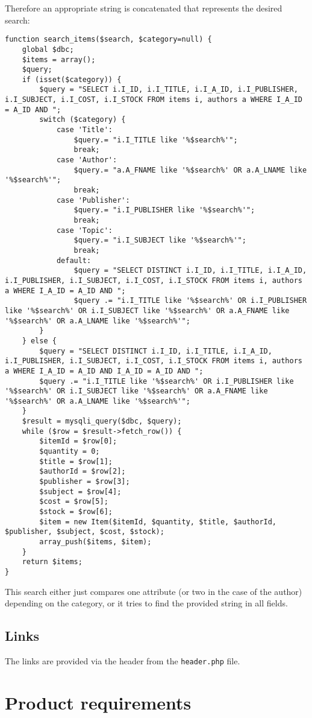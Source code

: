 Therefore an appropriate string is concatenated that represents the desired search:

\begin{lstlisting}[caption=The search function]
function search_items($search, $category=null) {
	global $dbc;
	$items = array();
	$query;
	if (isset($category)) {
		$query = "SELECT i.I_ID, i.I_TITLE, i.I_A_ID, i.I_PUBLISHER, i.I_SUBJECT, i.I_COST, i.I_STOCK FROM items i, authors a WHERE I_A_ID = A_ID AND ";
		switch ($category) {
			case 'Title':
				$query.= "i.I_TITLE like '%$search%'";
				break;
			case 'Author':
				$query.= "a.A_FNAME like '%$search%' OR a.A_LNAME like '%$search%'";
				break;
			case 'Publisher':
				$query.= "i.I_PUBLISHER like '%$search%'";
				break;
			case 'Topic':
				$query.= "i.I_SUBJECT like '%$search%'";
				break;
			default:
				$query = "SELECT DISTINCT i.I_ID, i.I_TITLE, i.I_A_ID, i.I_PUBLISHER, i.I_SUBJECT, i.I_COST, i.I_STOCK FROM items i, authors a WHERE I_A_ID = A_ID AND ";
				$query .= "i.I_TITLE like '%$search%' OR i.I_PUBLISHER like '%$search%' OR i.I_SUBJECT like '%$search%' OR a.A_FNAME like '%$search%' OR a.A_LNAME like '%$search%'";
		}
	} else {
		$query = "SELECT DISTINCT i.I_ID, i.I_TITLE, i.I_A_ID, i.I_PUBLISHER, i.I_SUBJECT, i.I_COST, i.I_STOCK FROM items i, authors a WHERE I_A_ID = A_ID AND I_A_ID = A_ID AND ";
		$query .= "i.I_TITLE like '%$search%' OR i.I_PUBLISHER like '%$search%' OR i.I_SUBJECT like '%$search%' OR a.A_FNAME like '%$search%' OR a.A_LNAME like '%$search%'";
	}
	$result = mysqli_query($dbc, $query);
	while ($row = $result->fetch_row()) {
		$itemId = $row[0];
		$quantity = 0;
		$title = $row[1];
		$authorId = $row[2];
		$publisher = $row[3];
		$subject = $row[4];
		$cost = $row[5];
		$stock = $row[6];
		$item = new Item($itemId, $quantity, $title, $authorId, $publisher, $subject, $cost, $stock);
		array_push($items, $item);
	}
	return $items;
}
\end{lstlisting}

This search either just compares one attribute (or two in the case of the author) depending on the category, or it tries to find the provided string in all fields.

\subsection{Links}

The links are provided via the header from the \texttt{header.php} file.

\section{Product requirements}
\label{sec:product_requirements}

